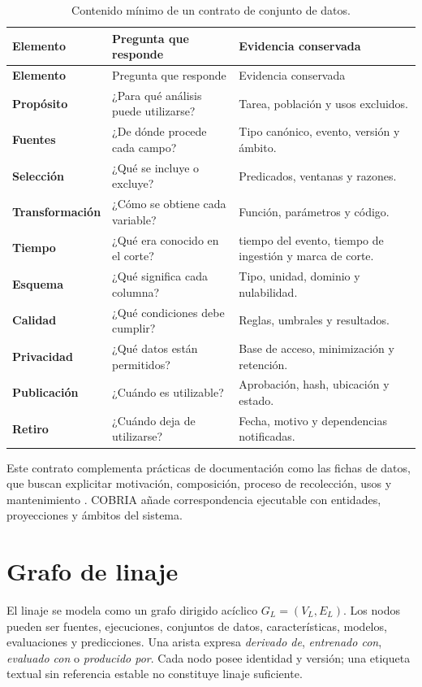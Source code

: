 \begin{longtable}{>{\bfseries}p{3.2cm}p{5.1cm}p{6cm}}
\caption{Contenido mínimo de un contrato de conjunto de datos.}\label{tab:contrato-conjunto de datos}\\
\toprule
Elemento & Pregunta que responde & Evidencia conservada \\
\midrule
\endfirsthead
\toprule
Elemento & Pregunta que responde & Evidencia conservada \\
\midrule
\endhead
Propósito & ¿Para qué análisis puede utilizarse? & Tarea, población y usos excluidos.\\
Fuentes & ¿De dónde procede cada campo? & Tipo canónico, evento, versión y ámbito.\\
Selección & ¿Qué se incluye o excluye? & Predicados, ventanas y razones.\\
Transformación & ¿Cómo se obtiene cada variable? & Función, parámetros y código.\\
Tiempo & ¿Qué era conocido en el corte? & tiempo del evento, tiempo de ingestión y marca de corte.\\
Esquema & ¿Qué significa cada columna? & Tipo, unidad, dominio y nulabilidad.\\
Calidad & ¿Qué condiciones debe cumplir? & Reglas, umbrales y resultados.\\
Privacidad & ¿Qué datos están permitidos? & Base de acceso, minimización y retención.\\
Publicación & ¿Cuándo es utilizable? & Aprobación, hash, ubicación y estado.\\
Retiro & ¿Cuándo deja de utilizarse? & Fecha, motivo y dependencias notificadas.\\
\bottomrule
\end{longtable}

Este contrato complementa prácticas de documentación como las fichas de datos, que
buscan explicitar motivación, composición, proceso de recolección, usos y mantenimiento
\parencite{gebru2021datasheets}. COBRIA añade correspondencia ejecutable con entidades,
proyecciones y ámbitos del sistema.

\section{Grafo de linaje}

El linaje se modela como un grafo dirigido acíclico $G_L=(V_L,E_L)$. Los nodos pueden
ser fuentes, ejecuciones, conjuntos de datos, características, modelos, evaluaciones y
predicciones. Una arista expresa \emph{derivado de}, \emph{entrenado con},
\emph{evaluado con} o \emph{producido por}. Cada nodo posee identidad y versión; una etiqueta textual
sin referencia estable no constituye linaje suficiente.

